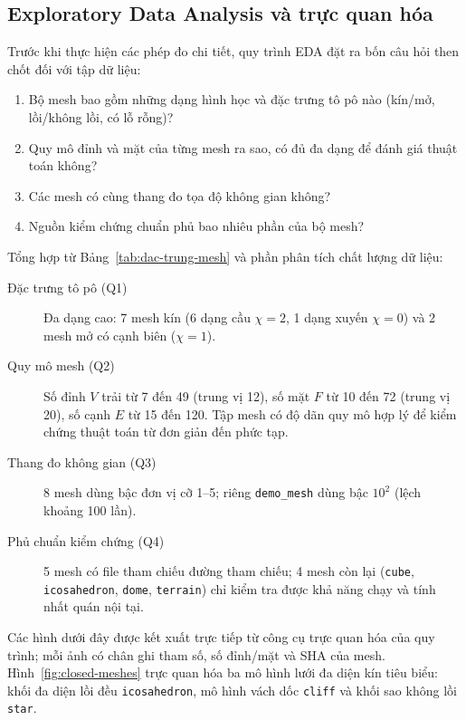 \subsection{Exploratory Data Analysis và trực quan hóa}

Trước khi thực hiện các phép đo chi tiết, quy trình EDA đặt ra bốn câu hỏi then
chốt đối với tập dữ liệu:
\begin{enumerate}
  \item Bộ mesh bao gồm những dạng hình học và đặc trưng tô pô nào (kín/mở,
    lồi/không lồi, có lỗ rỗng)?
  \item Quy mô đỉnh và mặt của từng mesh ra sao, có đủ đa dạng để đánh giá thuật
    toán không?
  \item Các mesh có cùng thang đo tọa độ không gian không?
  \item Nguồn kiểm chứng chuẩn phủ bao nhiêu phần của bộ mesh?
\end{enumerate}
Tổng hợp từ Bảng~\ref{tab:dac-trung-mesh} và phần phân tích chất lượng dữ liệu:
\begin{description}
  \item[Đặc trưng tô pô (Q1)] Đa dạng cao: 7 mesh kín (6 dạng cầu $\chi=2$, 1 dạng
    xuyến $\chi=0$) và 2 mesh mở có cạnh biên ($\chi=1$).
  \item[Quy mô mesh (Q2)] Số đỉnh $V$ trải từ 7 đến 49 (trung vị 12), số mặt $F$
    từ 10 đến 72 (trung vị 20), số cạnh $E$ từ 15 đến 120. Tập mesh có độ dãn quy
    mô hợp lý để kiểm chứng thuật toán từ đơn giản đến phức tạp.
  \item[Thang đo không gian (Q3)] 8 mesh dùng bậc đơn vị cỡ 1--5; riêng
    \texttt{demo\_mesh} dùng bậc $10^2$ (lệch khoảng 100 lần).
  \item[Phủ chuẩn kiểm chứng (Q4)] 5 mesh có file tham chiếu
    đường tham chiếu; 4 mesh còn lại (\texttt{cube},
    \texttt{icosahedron}, \texttt{dome}, \texttt{terrain}) chỉ kiểm tra được
    khả năng chạy và tính nhất quán nội tại.
\end{description}

Các hình dưới đây được kết xuất trực tiếp từ công cụ trực quan hóa của quy
trình; mỗi ảnh có chân ghi tham số, số đỉnh/mặt và SHA của mesh.
Hình~\ref{fig:closed-meshes} trực quan hóa ba mô hình lưới đa diện kín tiêu biểu:
khối đa diện lồi đều \texttt{icosahedron}, mô hình vách dốc \texttt{cliff} và khối
sao không lồi \texttt{star}.

